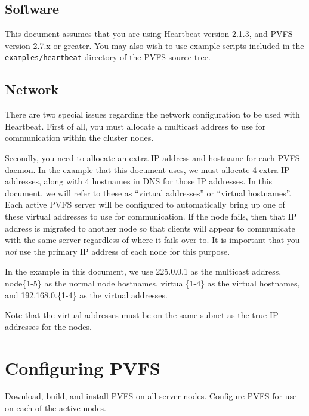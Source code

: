 \documentclass[11pt]{article}
\begin{document}
\subsection{Software}

This document assumes that you are using Heartbeat version 2.1.3,
and PVFS version 2.7.x or greater.  You may also wish to use example
scripts included in the \texttt{examples/heartbeat} directory of the
PVFS source tree.

\subsection{Network}

There are two special issues regarding the network configuration to be
used with Heartbeat.  First of all, you must allocate a multicast
address to use for communication within the cluster nodes.

Secondly, you need to allocate an extra IP address and hostname for each
PVFS daemon.  In the example that this document uses, we must allocate 4
extra IP addresses, along with 4 hostnames in DNS for those IP addresses.
In this document, we will refer to these as ``virtual addresses'' or
``virtual hostnames''.  Each active PVFS server will be configured
to automatically bring up one of these virtual addresses to use for
communication.  If the node fails, then that IP address is migrated to
another node so that clients will appear to communicate with the same
server regardless of where it fails over to.  It is important that you
\emph{not} use the primary IP address of each node for this purpose.

In the example in this document, we use 225.0.0.1 as the multicast
address, node\{1-5\} as the normal node hostnames,
virtual\{1-4\} as the virtual hostnames, and 192.168.0.\{1-4\} as the
virtual addresses.

Note that the virtual addresses must be on the same subnet as the true
IP addresses for the nodes.

\section{Configuring PVFS}

Download, build, and install PVFS on all server nodes.  Configure PVFS
for use on each of the active nodes.  
\end{document}
